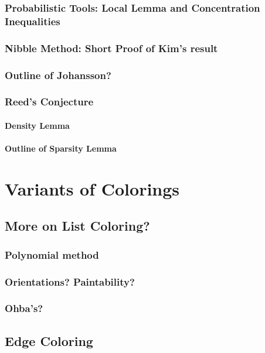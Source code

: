 \documentclass[12pt,twoside,openright,a4paper]{book}
\begin{document}
\section{Probabilistic Tools: Local Lemma and Concentration Inequalities}
\section{Nibble Method: Short Proof of Kim's result}
\section{Outline of Johansson?}
\section{Reed's Conjecture}
\subsection{Density Lemma}
\subsection{Outline of Sparsity Lemma}

\part{Variants of Colorings}

\chapter{More on List Coloring?}

\section{Polynomial method}

\section{Orientations? Paintability?}
\section{Ohba's?}

\chapter{Edge Coloring}\label{chap:edgecol}
\end{document}
